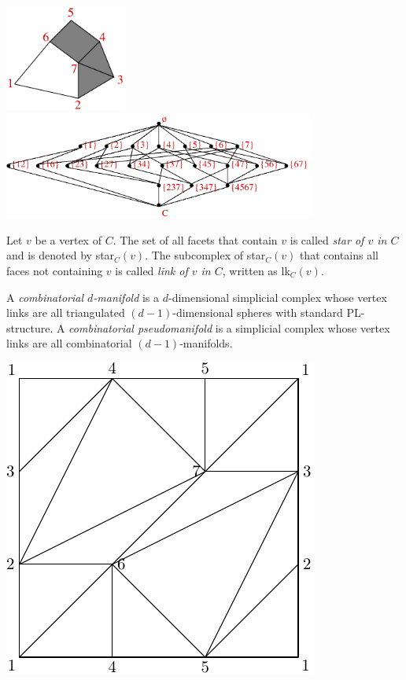 \documentclass[a4paper,11pt]{report}
\begin{document}
{{  \begin{center} \includegraphics[height=3.5cm]{figures/hasse_complex}\quad
\includegraphics[height=3.5cm]{figures/hasse_diagram}\\ \end{center}  

 Let $v$ be a vertex of $C$. The set of all facets that contain $v$ is called \emph{star of $v$ in $C$} and is denoted by star$_C(v)$. The subcomplex of star$_C(v)$ that contains all faces not containing $v$ is called \emph{link of $v$ in $C$}, written as lk$_C(v)$. 

 

 A \emph{combinatorial $d$-manifold} is a $d$-dimensional simplicial complex whose vertex links are all triangulated $(d-1)$-dimensional spheres with standard PL-structure. A \emph{combinatorial pseudomanifold} is a simplicial complex whose vertex links are all combinatorial $(d-1)$-manifolds. 

  \begin{center}
\includegraphics[height=.5\textwidth]{figures/moebius}\\ \end{center}  

}}
\end{document}
